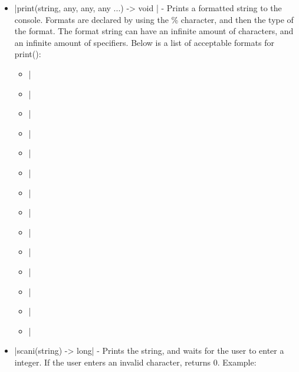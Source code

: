 \documentclass[12pt, letterpaper, oneside]{article}
\begin{document}
\begin{itemize}
		
		\begin{spverbatim}
			printString("\n"); - Prints newline to the console.
			printString("Hello World!") - Prints "Hello World!" to the console.
		\end{spverbatim}
		\item[--] \spverb|print(string, any, any, any ...) -> void | - Prints a formatted string to the console. Formats are declared by using the \% character, and then the type of the format. The format string can have an infinite amount of characters, and an infinite amount of specifiers. Below is a list of acceptable formats for print():
		\begin{itemize}
			\item[--] \spverb|%
			\item[--] \spverb|%
			\item[--] \spverb|%
			\item[--] \spverb|%
			\item[--] \spverb|%
			\item[--] \spverb|%
			\item[--] \spverb|%
			\item[--] \spverb|%
			\item[--] \spverb|%
			\item[--] \spverb|%
			
			
			\item[--] \spverb|%
			\item[--] \spverb|%
			\item[--] \spverb|%
			\item[--] \spverb|%
		\end{itemize}
		\newpage
		\item[--] \spverb|scani(string) -> long| - Prints the string, and waits for the user to enter a integer. If the user enters an invalid character, returns 0. Example:
		

\end{itemize}
\end{document}
